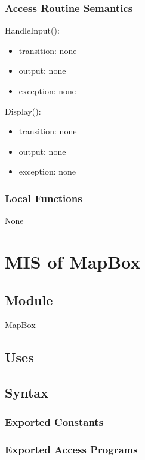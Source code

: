 \documentclass[12pt, titlepage]{article}
\begin{document}
\begin{itemize}
\subsubsection{Access Routine Semantics}

\noindent HandleInput():
\begin{itemize}
\item transition: none
\item output: none
\item exception: none
\end{itemize}

\noindent Display():
\begin{itemize}
\item transition: none
\item output: none
\item exception: none
\end{itemize}

\subsubsection{Local Functions}

None

\newpage

\section{MIS of MapBox} \label{mMap}

\subsection{Module}

MapBox

\subsection{Uses}

\subsection{Syntax}

\subsubsection{Exported Constants}

\subsubsection{Exported Access Programs}


\end{itemize}
\end{document}
